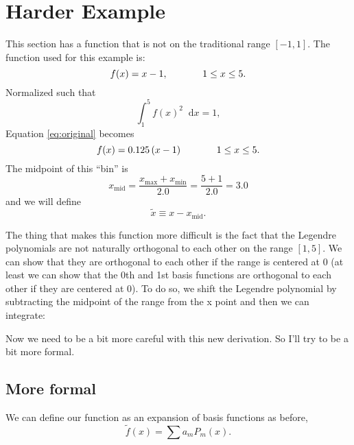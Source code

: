 \documentclass[12pt]{article}
\newcommand{\xmax}{x_{\max}}
\newcommand{\xmin}{x_{\min}}
\newcommand{\xmid}{x_{\mathrm{mid}}}
\newcommand{\dd}{\mathop{}\!\mathrm{d}}
\begin{document}
\section{Harder Example}
This section has a function that is not on the traditional range $[-1,1]$.  The function used for this example is:
\begin{equation}
    f(x) = x-1, \hspace{0.5in} 1 \leq x \leq 5.
    \label{eq:original}
\end{equation}
Normalized such that 
\begin{equation}
    \int_1^5 f(x)^2 \dd x = 1,
\end{equation}
Equation \ref{eq:original} becomes
\begin{equation}
    f(x) = 0.125\left( x-1 \right) \hspace{0.5in} 1 \leq x \leq 5.
    \label{eq:normalized}
\end{equation}
The midpoint of this ``bin'' is
\begin{equation}
    \xmid = \frac{\xmax + \xmin}{2.0} = \frac{5 + 1}{2.0} = 3.0
    \label{eq:xmid}
\end{equation}
and we will define
\begin{equation}
    \tilde{x} \equiv x - \xmid. \label{eq:xTilde}
\end{equation}

The thing that makes this function more difficult is the fact that the Legendre polynomials are not naturally orthogonal to each other on the range $[1,5]$.  We can show that they are orthogonal to each other if the range is centered at 0 (at least we can show that the 0th and 1st basis functions are orthogonal to each other if they are centered at 0).  To do so, we shift the Legendre polynomial by subtracting the midpoint of the range from the x point and then we can integrate:

Now we need to be a bit more careful with this new derivation.  So I'll try to be a bit more formal.

\subsection{More formal}
We can define our function as an expansion of basis functions as before,
\begin{equation}
    \tilde{f}(x) = \sum a_m P_m(x).
    \label{eq:fExpansion}
\end{equation}
\end{document}
